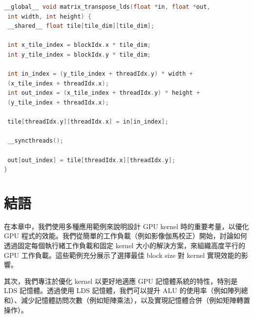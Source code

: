 \begin{lstlisting}[language=C, caption={使用 LDS 的矩陣轉置 kernel 範例。}, captionpos=t, label={lst:transpose}]
__global__ void matrix_transpose_lds(float *in, float *out,
 int width, int height) {
 __shared__ float tile[tile_dim][tile_dim];

 int x_tile_index = blockIdx.x * tile_dim;
 int y_tile_index = blockIdx.y * tile_dim;

 int in_index = (y_tile_index + threadIdx.y) * width +
 (x_tile_index + threadIdx.x);
 int out_index = (x_tile_index + threadIdx.y) * height +
 (y_tile_index + threadIdx.x);

 tile[threadIdx.y][threadIdx.x] = in[in_index];

 __syncthreads();

 out[out_index] = tile[threadIdx.x][threadIdx.y];
}
\end{lstlisting}

\section{結語}
在本章中，我們使用多種應用範例來說明設計 GPU kernel 時的重要考量，以優化 GPU 程式的效能。我們從簡單的工作負載（例如影像伽馬校正）開始，討論如何透過固定每個執行緒工作負載和固定 kernel 大小的解決方案，來組織高度平行的 GPU 工作負載。這些範例充分展示了選擇最佳 block size 對 kernel 實現效能的影響。

其次，我們專注於優化 kernel 以更好地適應 GPU 記憶體系統的特性，特別是 LDS 記憶體。透過使用 LDS 記憶體，我們可以提升 ALU 的使用率（例如陣列總和）、減少記憶體訪問次數（例如矩陣乘法），以及實現記憶體合併（例如矩陣轉置操作）。